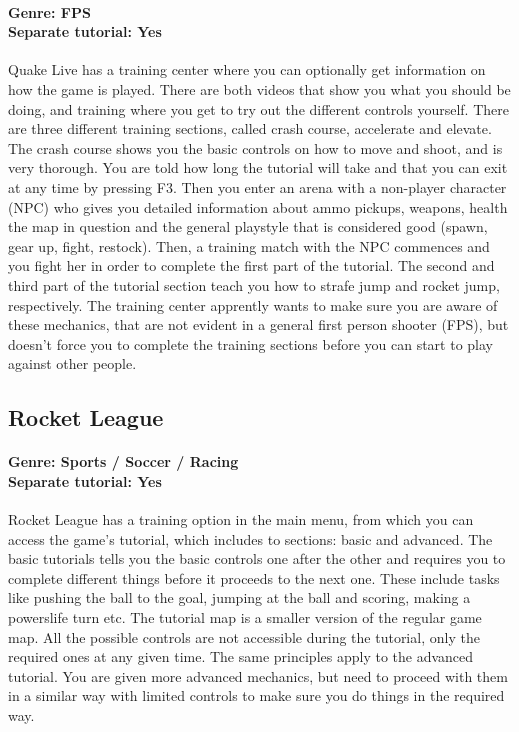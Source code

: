 \paragraph{Genre: FPS \\ Separate tutorial: Yes \\}
Quake Live has a training center where you can optionally get information on how the game is played. There are both videos that show you what you should be doing, and training where you get to try out the different controls yourself. There are three different training sections, called crash course, accelerate and elevate. The crash course shows you the basic controls on how to move and shoot, and is very thorough. You are told how long the tutorial will take and that you can exit at any time by pressing F3. Then you enter an arena with a non-player character (NPC) who gives you detailed information about ammo pickups, weapons, health the map in question and the general playstyle that is considered good (spawn, gear up, fight, restock). Then, a training match with the NPC commences and you fight her in order to complete the first part of the tutorial. The second and third part of the tutorial section teach you how to strafe jump and rocket jump, respectively. The training center apprently wants to make sure you are aware of these mechanics, that are not evident in a general first person shooter (FPS), but doesn't force you to complete the training sections before you can start to play against other people.

\subsection{Rocket League}
\paragraph{Genre: Sports / Soccer / Racing \\ Separate tutorial: Yes \\}
Rocket League has a training option in the main menu, from which you can access the game's tutorial, which includes to sections: basic and advanced.
The basic tutorials tells you the basic controls one after the other and requires you to complete different things before it proceeds to the next one. These include tasks like pushing the ball to the goal, jumping at the ball and scoring, making a powerslife turn etc. The tutorial map is a smaller version of the regular game map. All the possible controls are not accessible during the tutorial, only the required ones at any given time.
The same principles apply to the advanced tutorial. You are given more advanced mechanics, but need to proceed with them in a similar way with limited controls to make sure you do things in the required way.

